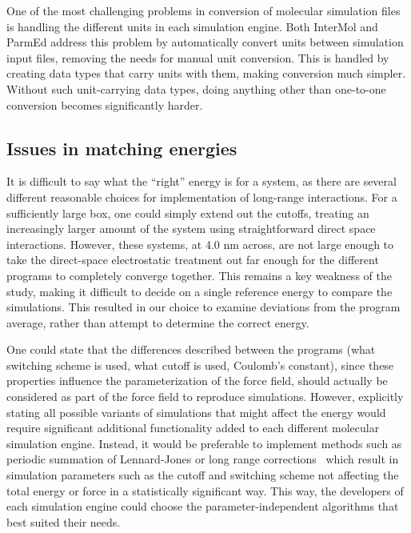  One of the most challenging problems in conversion of molecular
 simulation files is handling the different units in each simulation
 engine. Both InterMol and ParmEd address this problem by
 automatically convert units between simulation input files, removing
 the needs for manual unit conversion. This is handled by creating
 data types that carry units with them, making conversion much
 simpler.  Without such unit-carrying data types, doing anything other
 than one-to-one conversion becomes significantly harder.

\subsection*{Issues in matching energies}

It is difficult to say what the ``right'' energy is for a system, as
there are several different reasonable choices for implementation of
long-range interactions. For a sufficiently large box, one could
simply extend out the cutoffs, treating an increasingly larger amount
of the system using straightforward direct space interactions.
However, these systems, at 4.0 nm across, are not large enough to take
the direct-space electrostatic treatment out far enough for the
different programs to completely converge together.  This remains a
key weakness of the study, making it difficult to decide on a single
reference energy to compare the simulations. This resulted in our
choice to examine deviations from the program average, rather than
attempt to determine the correct energy. 

One could state that the differences described between the programs
(what switching scheme is used, what cutoff is used, Coulomb's
constant), since these properties influence the parameterization of
the force field, should actually be considered as part of the force
field to reproduce simulations.  However, explicitly stating all
possible variants of simulations that might affect the energy would
require significant additional functionality added to each different
molecular simulation engine. Instead, it would be preferable to
implement methods such as periodic summation of Lennard-Jones or long
range corrections~\cite{wu_isotropic_2005,veld_application_2007} which
result in simulation parameters such as the cutoff and switching
scheme not affecting the total energy or force in a statistically
significant way. This way, the developers of each simulation engine
could choose the parameter-independent algorithms that best suited
their needs.

